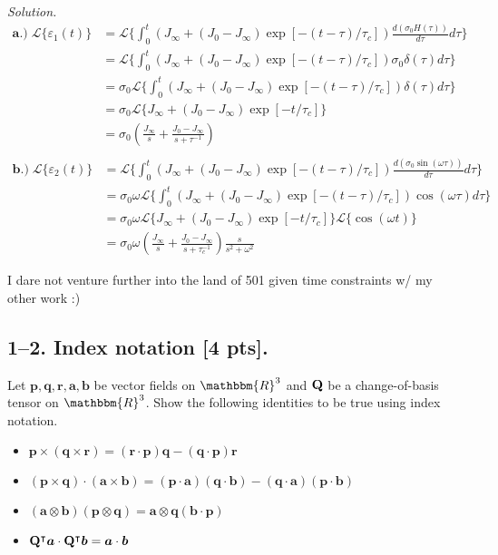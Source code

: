 \bigskip
\textit{Solution.}
\begin{align*}
\bm{a.)}\; \mathcal{L}\{\varepsilon_1(t)\} &= \mathcal{L}\{ \int_0^t ( J_\infty + (J_0-J_\infty)\exp[-(t-\tau)/\tau_c]) \frac{d(\sigma_0 H(\tau))}{d\tau} d\tau \} \\
&= \mathcal{L}\{ \int_0^t ( J_\infty + (J_0-J_\infty)\exp[-(t-\tau)/\tau_c]) \sigma_0 \delta(\tau) d\tau \} \\
&= \sigma_0 \mathcal{L}\{ \int_0^t ( J_\infty + (J_0-J_\infty)\exp[-(t-\tau)/\tau_c]) \delta(\tau) d\tau \} \\
&= \sigma_0 \mathcal{L}\{J_\infty + (J_0 - J_\infty)\exp[-t/\tau_c]\} \\
&= \sigma_0 \left(\frac{J_\infty}{s} + \frac{J_0 - J_\infty}{s+\tau^{-1}}\right) \\
\end{align*}
\begin{align*}
\bm{b.)}\; \mathcal{L}\{\varepsilon_2(t)\} &= \mathcal{L}\{ \int_0^t ( J_\infty + (J_0-J_\infty)\exp[-(t-\tau)/\tau_c]) \frac{d(\sigma_0 \sin(\omega \tau))}{d\tau} d\tau \} \\
&= \sigma_0 \omega \mathcal{L}\{ \int_0^t ( J_\infty + (J_0-J_\infty)\exp[-(t-\tau)/\tau_c]) \cos(\omega \tau) d\tau \} \\
&= \sigma_0 \omega \mathcal{L}\{J_\infty + (J_0 - J_\infty)\exp[-t/\tau_c]\} \mathcal{L}\{\cos(\omega t)\} \\
&= \sigma_0 \omega \left( \frac{J_\infty}{s} + \frac{J_0 - J_\infty}{s+\tau_c^{-1}} \right) \frac{s}{s^2+\omega^2}
\end{align*}

I dare not venture further into the land of 501 given time constraints w/ my other work :)


\bigskip
\subsection*{1--2. \textbf{Index notation} [4 pts].} Let $\bm{p}, \bm{q}, \bm{r}, \bm{a}, \bm{b}$ be vector fields on $\mathbbm{R}^3$ and $\mathbf{Q}$ be a change-of-basis tensor on $\mathbbm{R}^3$. Show the following identities to be true using index notation. 

\begin{itemize}
    \item $\bm{p} \times (\bm{q} \times \bm{r}) = (\bm{r} \cdot \bm{p}) \bm{q} - (\bm{q} \cdot \bm{p}) \bm{r}$
    \item $(\bm{p} \times \bm{q}) \cdot (\bm{a} \times \bm{b}) = (\bm{p} \cdot \bm{a}) (\bm{q} \cdot \bm{b}) - (\bm{q} \cdot \bm{a})(\bm{p} \cdot \bm{b})$
    \item $(\bm{a} \otimes \bm{b})(\bm{p} \otimes \bm{q}) = \bm{a}\otimes\bm{q}(\bm{b} \cdot \bm{p}) $
    \item $\mathbf{Q}^\intercal\bm{a} \cdot \mathbf{Q}^\intercal\bm{b} = \bm{a}\cdot\bm{b} $
\end{itemize}

